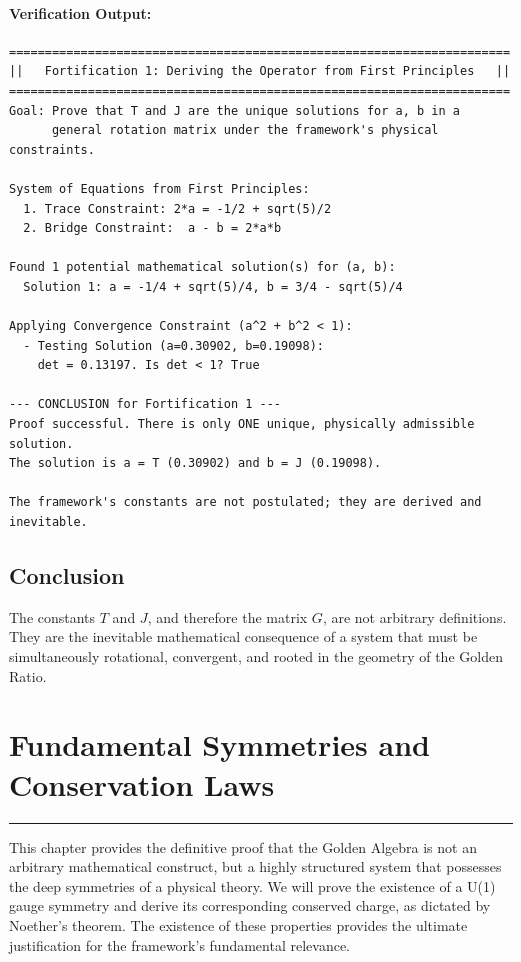 \paragraph{Verification Output:}
\begin{verbatim}
======================================================================
||   Fortification 1: Deriving the Operator from First Principles   ||
======================================================================
Goal: Prove that T and J are the unique solutions for a, b in a
      general rotation matrix under the framework's physical constraints.

System of Equations from First Principles:
  1. Trace Constraint: 2*a = -1/2 + sqrt(5)/2
  2. Bridge Constraint:  a - b = 2*a*b

Found 1 potential mathematical solution(s) for (a, b):
  Solution 1: a = -1/4 + sqrt(5)/4, b = 3/4 - sqrt(5)/4

Applying Convergence Constraint (a^2 + b^2 < 1):
  - Testing Solution (a=0.30902, b=0.19098):
    det = 0.13197. Is det < 1? True

--- CONCLUSION for Fortification 1 ---
Proof successful. There is only ONE unique, physically admissible solution.
The solution is a = T (0.30902) and b = J (0.19098).

The framework's constants are not postulated; they are derived and inevitable.
\end{verbatim}

\subsection*{Conclusion}
The constants $T$ and $J$, and therefore the matrix $G$, are not arbitrary definitions. They are the inevitable mathematical consequence of a system that must be simultaneously rotational, convergent, and rooted in the geometry of the Golden Ratio.


\section{Fundamental Symmetries and Conservation Laws}
\label{sec:fundamental_symmetries}

\hrule
\vspace{1em}
This chapter provides the definitive proof that the Golden Algebra is not an arbitrary mathematical construct, but a highly structured system that possesses the deep symmetries of a physical theory. We will prove the existence of a U(1) gauge symmetry and derive its corresponding conserved charge, as dictated by Noether's theorem. The existence of these properties provides the ultimate justification for the framework's fundamental relevance.

